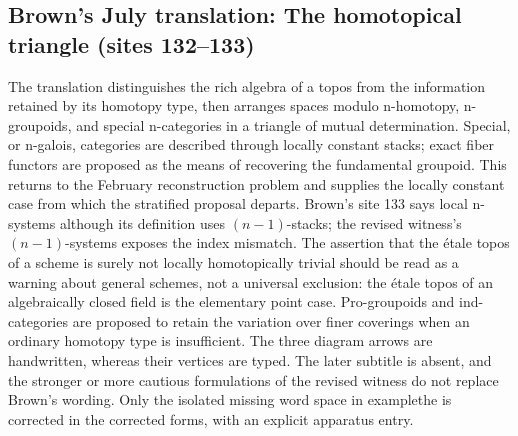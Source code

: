 \subsection*{Brown's July translation: The homotopical triangle (sites 132--133)}
The translation distinguishes the rich algebra of a topos from the information retained by its homotopy type, then arranges spaces modulo n-homotopy, n-groupoids, and special n-categories in a triangle of mutual determination. Special, or n-galois, categories are described through locally constant stacks; exact fiber functors are proposed as the means of recovering the fundamental groupoid. This returns to the February reconstruction problem and supplies the locally constant case from which the stratified proposal departs. Brown's site 133 says local n-systems although its definition uses $(n-1)$-stacks; the revised witness's $(n-1)$-systems exposes the index mismatch. The assertion that the étale topos of a scheme is surely not locally homotopically trivial should be read as a warning about general schemes, not a universal exclusion: the étale topos of an algebraically closed field is the elementary point case. Pro-groupoids and ind-categories are proposed to retain the variation over finer coverings when an ordinary homotopy type is insufficient. The three diagram arrows are handwritten, whereas their vertices are typed. The later subtitle is absent, and the stronger or more cautious formulations of the revised witness do not replace Brown's wording. Only the isolated missing word space in examplethe is corrected in the corrected forms, with an explicit apparatus entry.

